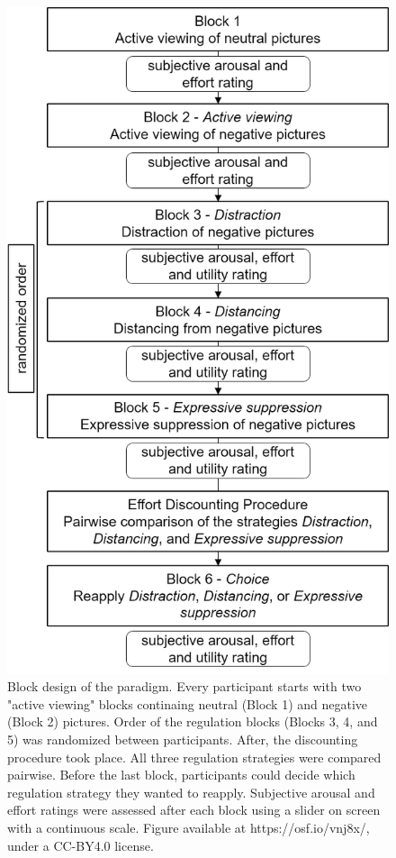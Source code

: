 \documentclass[
  man,floatsintext]{apa6}
\begin{document}
\begin{figure}[H]
\includegraphics[width=\textwidth]{figures/Design_ER-ED} \caption{Block design of the paradigm. Every participant starts with two "active viewing" blocks continaing neutral (Block 1) and negative (Block 2) pictures. Order of the regulation blocks (Blocks 3, 4, and 5) was randomized between participants. After, the discounting procedure took place. All three regulation strategies were compared pairwise. Before the last block, participants could decide which regulation strategy they wanted to reapply. Subjective arousal and effort ratings were assessed after each block using a slider on screen with a continuous scale. Figure available at https://osf.io/vnj8x/, under a CC-BY4.0 license.}\label{fig:DesignERED}
\end{figure}
\end{document}
